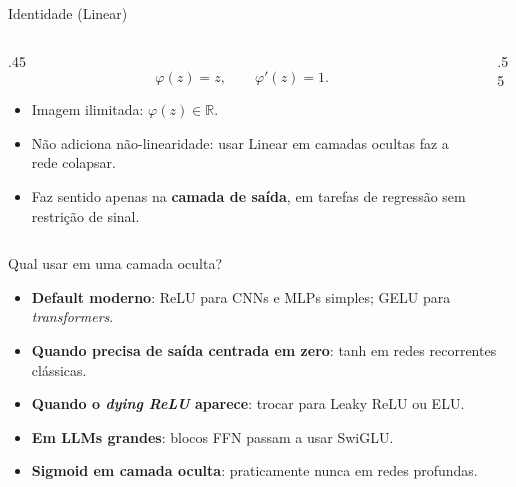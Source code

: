 \documentclass[aspectratio=169,xcolor=dvipsnames]{beamer}
\begin{document}
  \begin{frame}{Identidade (Linear)}
    \begin{columns}
      \begin{column}{.45\linewidth}
        \[
          \varphi(z) = z,\qquad \varphi'(z) = 1.
        \]
        \begin{itemize}
          \item Imagem ilimitada: $\varphi(z)\in\mathbb{R}$.
          \item Não adiciona não-linearidade: usar Linear em camadas ocultas faz a rede colapsar.
          \item Faz sentido apenas na \textbf{camada de saída}, em tarefas de regressão sem
            restrição de sinal.
        \end{itemize}
      \end{column}
      \begin{column}{.55\linewidth}
        \centering
      \end{column}
    \end{columns}
  \end{frame}


  \begin{frame}{Qual usar em uma camada oculta?}
    \begin{itemize}
      \item \textbf{Default moderno}: ReLU para CNNs e MLPs simples; GELU para
        \textit{transformers}.
      \item \textbf{Quando precisa de saída centrada em zero}: tanh em redes recorrentes
        clássicas.
      \item \textbf{Quando o \textit{dying ReLU} aparece}: trocar para Leaky ReLU ou ELU.
      \item \textbf{Em LLMs grandes}: blocos FFN passam a usar SwiGLU.
      \item \textbf{Sigmoid em camada oculta}: praticamente nunca em redes profundas.
    \end{itemize}
  \end{frame}
\end{document}
